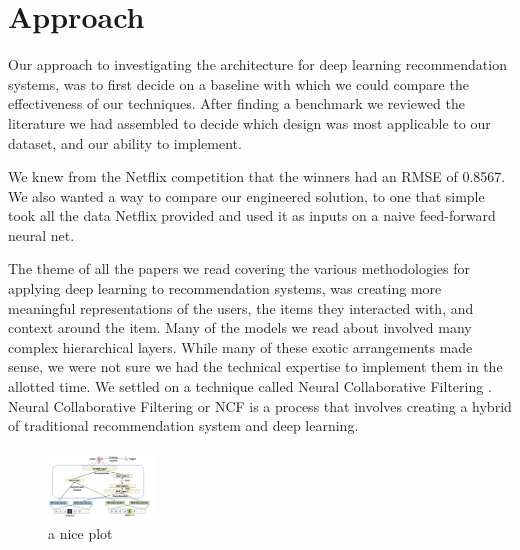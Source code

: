 \section{Approach}
Our approach to investigating the architecture for deep learning recommendation systems, was to first decide on a baseline with which we could compare the effectiveness of our techniques. After finding a benchmark we reviewed the literature we had assembled to decide which design was most applicable to our dataset, and our ability to implement.

 We knew from the Netflix competition that the winners had an RMSE of 0.8567. We also wanted a way to compare our engineered solution, to one that simple took all the data Netflix provided and used it as inputs on a naive feed-forward neural net. 

 The theme of all the papers we read covering the various methodologies for applying deep learning to recommendation systems, was creating more meaningful representations of the users, the items they interacted with, and context around the item. Many of the models we read about involved many complex hierarchical layers. While many of these exotic arrangements made sense, we were not sure we had the technical expertise to implement them in the allotted time. We settled on a technique called Neural Collaborative Filtering \cite{He2017}. Neural Collaborative Filtering or NCF is a process that involves creating a hybrid of traditional recommendation system and deep learning. 

 \begin{figure}[h]
    \centering
    \includegraphics[width=0.25\textwidth]{images/NCF_diagram.png}
    \caption{a nice plot}
    \label{fig:NCF diagram}
\end{figure}
